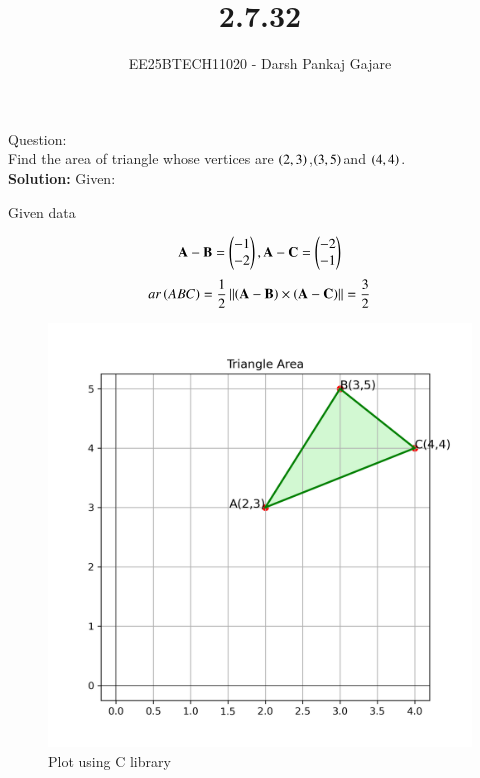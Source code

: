 \documentclass[journal,12pt,onecolumn]{IEEEtran}
\begin{document}
\title{2.7.32}
\author{EE25BTECH11020 - Darsh Pankaj Gajare}
{\let\newpage\relax\maketitle}
Question:\\
Find the area of triangle whose vertices are $\left(2,3\right)$,$\left(3,5\right)$and $\left(4,4\right)$.\\
\textbf{Solution:}
Given:
\begin{table}[H]
	\centering
	\label{}
	\caption{Given data}
	
\end{table}
\begin{align}
	\mathbf{A}-\mathbf{B}=\begin{pmatrix}-1\\-2\end{pmatrix},\mathbf{A}-\mathbf{C}=\begin{pmatrix}-2\\-1\end{pmatrix}
\end{align}
\begin{align}
	ar\left(ABC\right)=\frac{1}{2}\left\lVert\left(\mathbf{A}-\mathbf{B}\right)\times\left(\mathbf{A}-\mathbf{C}\right)\right\rVert=\frac{3}{2}
\end{align}
\begin{figure}[H]
	\centering
	\includegraphics[scale=0.5]{img}
	\caption*{Plot using C library}
	\label{img}
\end{figure}
\end{document}
